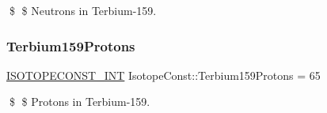 \$ \$ Neutrons in Terbium-\/159. \mbox{\label{group___isotope_const-_terbium-_tb159_ga9e85ea8be95abb0f3f603f83478934b4}} 
\subsubsection{\texorpdfstring{Terbium159\+Protons}{Terbium159Protons}}
{\footnotesize\ttfamily \mbox{\hyperlink{group___isotope_const-_macros_ga5f18360b3e99483a35c32d789e62621c}{I\+S\+O\+T\+O\+P\+E\+C\+O\+N\+S\+T\+\_\+\+I\+NT}} Isotope\+Const\+::\+Terbium159\+Protons = 65}

\$ \$ Protons in Terbium-\/159. 